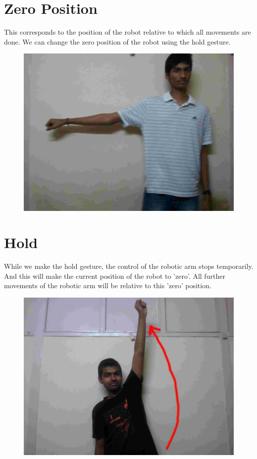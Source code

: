 \documentclass[a4wide]{scrreprt}
\begin{document}
\section*{Zero Position}
This corresponds to the position of the robot relative to which all movements are done. We can change the zero position of the robot using the hold gesture.
\begin{figure}[H]
\centering
\includegraphics[scale=0.1]{gestures/0.jpg}
\end{figure}

\section*{Hold}
While we make the hold gesture, the control of the robotic arm stops temporarily. And this will make the current position of the robot to 'zero'. All further movements of the robotic arm will be relative to this 'zero' position.
\begin{figure}[H]
\centering
\includegraphics[scale=0.1]{gestures/hold.jpg}
\end{figure}
\end{document}
